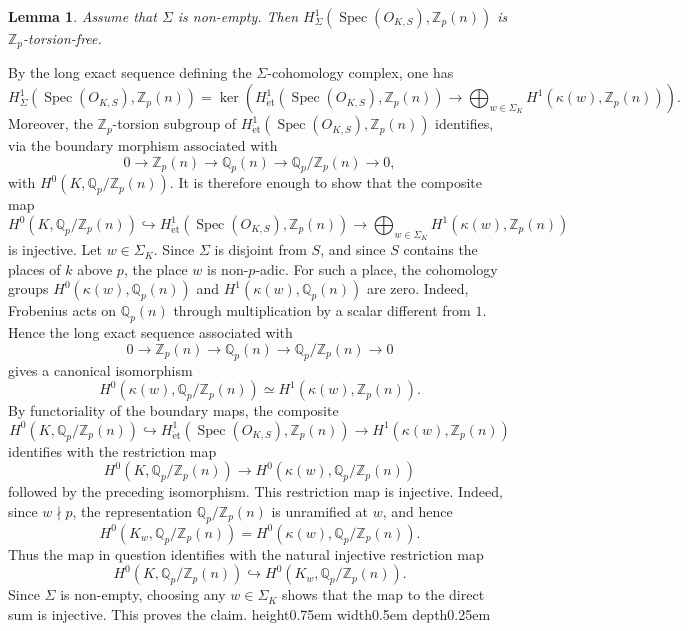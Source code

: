 \documentclass[a4paper,11pt]{article}
\newtheorem{lemma}[theorem]{Lemma}
\newenvironment{proof}[1][Proof]{\begin{trivlist}
\item[\hskip \labelsep {\bfseries #1}]}{\end{trivlist}}
\newcommand{\qed}{\nobreak \ifvmode \relax \else
    \ifdim\lastskip<1.5em \hskip-\lastskip
     \hskip1.5em plus0em minus0.5em \fi \nobreak
      \vrule height0.75em width0.5em depth0.25em\fi}
\begin{document}
\begin{lemma}
\label{lem:Sigma-cohomology-torsion-free}
Assume that $\Sigma$ is non-empty. Then
\(
H^1_{\Sigma}(\operatorname{Spec}(O_{K,S}),\mathbb Z_p(n))
\)
is $\mathbb Z_p$-torsion-free.
\end{lemma}

\begin{proof}
By the long exact sequence defining the $\Sigma$-cohomology complex, one has
\[
H^1_{\Sigma}(\operatorname{Spec}(O_{K,S}),\mathbb Z_p(n))
=
\ker\left(
H^1_{\mathrm{\acute{e}t}}(\operatorname{Spec}(O_{K,S}),\mathbb Z_p(n))
\to
\bigoplus_{w\in\Sigma_K}H^1(\kappa(w),\mathbb Z_p(n))
\right).
\]
Moreover, the $\mathbb Z_p$-torsion subgroup of
\(
H^1_{\mathrm{\acute{e}t}}(\operatorname{Spec}(O_{K,S}),\mathbb Z_p(n))
\)
identifies, via the boundary morphism associated with
\[
0\to \mathbb Z_p(n)\to \mathbb Q_p(n)\to
\mathbb Q_p/\mathbb Z_p(n)\to 0,
\]
with
\(
H^0(K,\mathbb Q_p/\mathbb Z_p(n)).
\)
It is therefore enough to show that the composite map
\[
H^0(K,\mathbb Q_p/\mathbb Z_p(n))
\hookrightarrow
H^1_{\mathrm{\acute{e}t}}(\operatorname{Spec}(O_{K,S}),\mathbb Z_p(n))
\to
\bigoplus_{w\in\Sigma_K}H^1(\kappa(w),\mathbb Z_p(n))
\]
is injective.
Let $w\in\Sigma_K$. Since \(\Sigma\) is disjoint from \(S\), and since \(S\) contains the places of
\(k\) above \(p\), the place \(w\) is non-\(p\)-adic. For such
a place, the cohomology groups
\(
H^0(\kappa(w),\mathbb Q_p(n))
\) and \(
H^1(\kappa(w),\mathbb Q_p(n))
\)
are zero. Indeed, Frobenius acts on $\mathbb Q_p(n)$ through multiplication by
a scalar different from $1$. Hence the long exact sequence associated with
\[
0\to \mathbb Z_p(n)\to \mathbb Q_p(n)\to
\mathbb Q_p/\mathbb Z_p(n)\to 0
\]
gives a canonical isomorphism
\[
H^0(\kappa(w),\mathbb Q_p/\mathbb Z_p(n))
\simeq
H^1(\kappa(w),\mathbb Z_p(n)).
\]
By functoriality of the boundary maps, the composite
\[
H^0(K,\mathbb Q_p/\mathbb Z_p(n))
\hookrightarrow
H^1_{\mathrm{\acute{e}t}}(\operatorname{Spec}(O_{K,S}),\mathbb Z_p(n))
\to
H^1(\kappa(w),\mathbb Z_p(n))
\]
identifies with the restriction map
\[
H^0(K,\mathbb Q_p/\mathbb Z_p(n))
\to
H^0(\kappa(w),\mathbb Q_p/\mathbb Z_p(n))
\]
followed by the preceding isomorphism. 
This restriction map is injective. Indeed, since \(w\nmid p\), the
representation \(\mathbb Q_p/\mathbb Z_p(n)\) is unramified at \(w\), and hence
\[
H^0(K_w,\mathbb Q_p/\mathbb Z_p(n))
=
H^0(\kappa(w),\mathbb Q_p/\mathbb Z_p(n)).
\]
Thus the map in question identifies with the natural injective restriction map
\[
H^0(K,\mathbb Q_p/\mathbb Z_p(n))
\hookrightarrow
H^0(K_w,\mathbb Q_p/\mathbb Z_p(n)).
\]
Since \(\Sigma\) is non-empty, choosing any \(w\in\Sigma_K\) shows that the map
to the direct sum is injective. This proves the claim.\qed
\end{proof}
\end{document}
